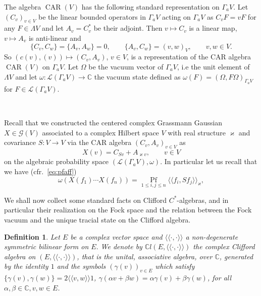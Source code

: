 \documentclass{article}
\newcommand{\cdummy}{\cdot}
\newcommand{\llangle}{{\langle\!\langle}}
\newcommand{\rrangle}{{\rangle\!\rangle}}
\newcommand{\tmop}[1]{\ensuremath{\operatorname{#1}}}
\newtheorem{definition}[theorem]{Definition}
\begin{document}
The algebra $\tmop{CAR} (V)$ has the following standard representation on
$\Gamma_a V$. Let $(C_v)_{v \in V}$ be the linear bounded operators in
$\Gamma_a V$ acting on $\Gamma_a V$ as $C_v F = v F$ for any $F \in \Lambda V$
and let $A_v = C_v^{\ast}$ be their adjoint. Then $v \mapsto C_v$ is a linear
map, $v \mapsto A_v$ is anti-linear and
\[ \{ C_v, C_w \} = \{ A_v, A_w \} = 0, \qquad \{ A_v, C_w \} = (v, w)_V,
   \qquad v, w \in V. \]
So $(c (v), (v)) \mapsto (C_v, A_v)$, $v \in V$, is a representation of the
CAR algebra $\tmop{CAR} (V)$ on $\Gamma_a V$. Let $\Omega$ be the vacuum
vector of $\Gamma_a V$, i.e the unit element of $\Lambda V$ and let $\omega :
\mathcal{L} (\Gamma_a V) \rightarrow \mathbb{C}$ the vacuum state defined as
$\omega (F) = (\Omega, F \Omega)_{\Gamma_a V}$ for $F \in \mathcal{L}
(\Gamma_a V)$.

\

Recall that we constructed the centered complex Grassmann Gaussian $X \in
\mathcal{G} (V)$ associated to a complex Hilbert space $V$ with real structure
$\varkappa$ and covariance $S : V \rightarrow V$ via the CAR algebra $(C_v,
A_v)_{v \in V}$ as
\[ X (v) = C_{S v} + A_{\varkappa v}, \qquad v \in V \]
on the algebraic probability space $(\mathcal{L} (\Gamma_a V), \omega)$. In
particular let us recall that we have (cfr.~{\eqref{eq:pfaff}})
\begin{equation}
  \omega (X (f_1) \cdots X (f_n)) = \underset{1 \leqslant i, j \leqslant
  n}{\tmop{Pf}} \llangle f_i, S f_j \rrangle_{\varkappa},
  \label{eq:complex-gauss-GP}
\end{equation}


We shall now collect some standard facts on Clifford $C^{\ast}$-algebras, and
in particular their realization on the Fock space and the relation between the
Fock vacuum and the unique tracial state on the Clifford algebra.

\begin{definition}
  \label{GPdef:Clifford}Let $E$ be a complex vector space and $\llangle
  \cdummy, \cdummy \rrangle$ a non-degenerate symmetric bilinear form on $E.$
  We denote by $\mathbb{C}l (E, \llangle \cdummy, \cdummy \rrangle)$ the
  complex Clifford algebra on $(E, \llangle \cdummy, \cdummy \rrangle)$, that
  is the unital, associative algebra, over $\mathbb{C}$, generated by the
  identity $1$ and the symbols $(\gamma (v))_{v \in E}$ which satisfy $\{
  \gamma (v), \gamma (w) \} = 2 \llangle v, w \rrangle 1$, $\gamma (\alpha v +
  \beta w) = \alpha \gamma (v) + \beta \gamma (w)$, for all $\alpha, \beta \in
  \mathbb{C}, v, w \in E$.
\end{definition}
\end{document}
